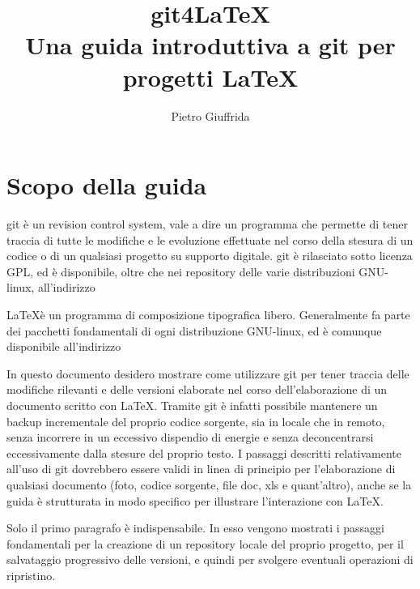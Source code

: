 \documentclass[a4paper,12pt,oneside]{article}
\begin{document}
\lstset{
  frame=single,
  breaklines = true, %
  breakautoindent = true, %
  breakindent = 90pt, %
}
\title{git4\LaTeX \\
  Una guida introduttiva a git per progetti \LaTeX}
\author{Pietro Giuffrida}
\maketitle

\tableofcontents

\newpage
\section{Scopo della guida}
git è un revision control system, vale a dire un programma che permette di
tener traccia di tutte le modifiche e le evoluzione effettuate nel corso della
stesura di un codice o di un qualsiasi progetto su supporto digitale. git è
rilasciato sotto licenza GPL, ed è disponibile, oltre che nei repository delle
varie distribuzioni GNU-linux, all'indirizzo %

\LaTeX è un programma di composizione tipografica libero.
Generalmente fa parte dei pacchetti fondamentali di ogni distribuzione
GNU-linux, ed è comunque disponibile all'indirizzo  %

In questo documento desidero mostrare come utilizzare git per tener traccia
delle modifiche rilevanti e delle versioni elaborate nel corso dell'elaborazione
di un documento scritto con \LaTeX. Tramite git è infatti possibile mantenere un
backup incrementale del proprio codice sorgente, sia in locale che in remoto,
senza incorrere in un eccessivo dispendio di energie e senza deconcentrarsi
eccessivamente dalla stesure del proprio testo. I passaggi descritti
relativamente all'uso di git dovrebbero essere validi in linea di principio per
l'elaborazione di qualsiasi documento (foto, codice sorgente, file doc, xls
e quant'altro), anche se la guida è strutturata in modo specifico per
illustrare l'interazione con \LaTeX.

Solo il primo paragrafo è indispensabile. In esso vengono mostrati i passaggi
fondamentali per la creazione di un repository locale del proprio progetto, per
il salvataggio progressivo delle versioni, e quindi per svolgere eventuali
operazioni di ripristino.
\end{document}
